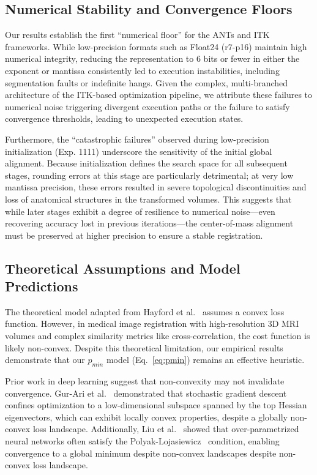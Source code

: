 \documentclass[journal,twoside,web]{ieeecolor}
\begin{document}
\subsection{Numerical Stability and Convergence Floors}
Our results establish the first ``numerical floor'' for the ANTs and ITK frameworks. While low-precision formats such as Float24 (r7-p16) maintain high numerical integrity, reducing the representation to 6 bits or fewer in either the exponent or mantissa consistently led to execution instabilities, including segmentation faults or indefinite hangs. Given the complex, multi-branched architecture of the ITK-based optimization pipeline, we attribute these failures to numerical noise triggering divergent execution paths or the failure to satisfy convergence thresholds, leading to unexpected execution states.

Furthermore, the ``catastrophic failures'' observed during low-precision initialization (Exp. 1111) underscore the sensitivity of the initial global alignment. Because initialization defines the search space for all subsequent stages, rounding errors at this stage are particularly detrimental; at very low mantissa precision, these errors resulted in severe topological discontinuities and loss of anatomical structures in the transformed volumes. This suggests that while later stages exhibit a degree of resilience to numerical noise---even recovering accuracy lost in previous iterations---the center-of-mass alignment must be preserved at higher precision to ensure a stable registration.

\subsection{Theoretical Assumptions and Model Predictions}
The theoretical model adapted from Hayford et al.~\cite{Hayford2024-kb} assumes a convex loss function. However, in medical image registration with high-resolution 3D MRI volumes and complex similarity metrics like cross-correlation, the cost function is likely non-convex. Despite this theoretical limitation, our empirical results demonstrate that our $p_{min}$ model (Eq.~\ref{eq:pmin}) remains an effective heuristic.

Prior work in deep learning suggest that non-convexity may not invalidate convergence. Gur-Ari et al.~\cite{Gur-Ari2018-pm} demonstrated that stochastic gradient descent confines optimization to a low-dimensional subspace spanned by the top Hessian eigenvectors, which can exhibit locally convex properties, despite a globally non-convex loss landscape. Additionally, Liu et al.~\cite{Liu2020-pe} showed that over-parametrized neural networks often satisfy the Polyak-Lojasiewicz~\cite{Lojasiewicz1963-xd,Polyak1963-nd} condition, enabling convergence to a global minimum despite non-convex landscapes despite non-convex loss landscape.
\end{document}
